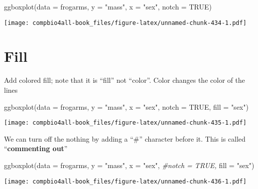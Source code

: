 \documentclass[
]{book}
\newenvironment{Shaded}{\begin{snugshade}}{\end{snugshade}}
\newcommand{\AttributeTok}[1]{\textcolor[rgb]{0.77,0.63,0.00}{#1}}
\newcommand{\CommentTok}[1]{\textcolor[rgb]{0.56,0.35,0.01}{\textit{#1}}}
\newcommand{\ConstantTok}[1]{\textcolor[rgb]{0.00,0.00,0.00}{#1}}
\newcommand{\FunctionTok}[1]{\textcolor[rgb]{0.00,0.00,0.00}{#1}}
\newcommand{\NormalTok}[1]{#1}
\newcommand{\StringTok}[1]{\textcolor[rgb]{0.31,0.60,0.02}{#1}}
\begin{document}
\begin{Shaded}
\begin{Highlighting}[]
\FunctionTok{ggboxplot}\NormalTok{(}\AttributeTok{data =}\NormalTok{ frogarms,}
          \AttributeTok{y =} \StringTok{"mass"}\NormalTok{,}
          \AttributeTok{x =} \StringTok{"sex"}\NormalTok{,}
          \AttributeTok{notch  =} \ConstantTok{TRUE}\NormalTok{)}
\end{Highlighting}
\end{Shaded}

\texttt{[image: compbio4all-book\_files/figure-latex/unnamed-chunk-434-1.pdf]}

\hypertarget{fill}{%
\section{Fill}\label{fill}}

Add colored fill; note that it is ``fill'' not ``color''. Color changes the color of the lines

\begin{Shaded}
\begin{Highlighting}[]
\FunctionTok{ggboxplot}\NormalTok{(}\AttributeTok{data =}\NormalTok{ frogarms,}
          \AttributeTok{y =} \StringTok{"mass"}\NormalTok{,}
          \AttributeTok{x =} \StringTok{"sex"}\NormalTok{,}
          \AttributeTok{notch  =} \ConstantTok{TRUE}\NormalTok{,}
          \AttributeTok{fill =} \StringTok{"sex"}\NormalTok{)}
\end{Highlighting}
\end{Shaded}

\texttt{[image: compbio4all-book\_files/figure-latex/unnamed-chunk-435-1.pdf]}

We can turn off the nothing by adding a ``\#'' character before it. This is called ``\textbf{commenting out}''

\begin{Shaded}
\begin{Highlighting}[]
\FunctionTok{ggboxplot}\NormalTok{(}\AttributeTok{data =}\NormalTok{ frogarms,}
          \AttributeTok{y =} \StringTok{"mass"}\NormalTok{,}
          \AttributeTok{x =} \StringTok{"sex"}\NormalTok{,}
          \CommentTok{\#notch  = TRUE,}
          \AttributeTok{fill =} \StringTok{"sex"}\NormalTok{)}
\end{Highlighting}
\end{Shaded}

\texttt{[image: compbio4all-book\_files/figure-latex/unnamed-chunk-436-1.pdf]}
\end{document}
